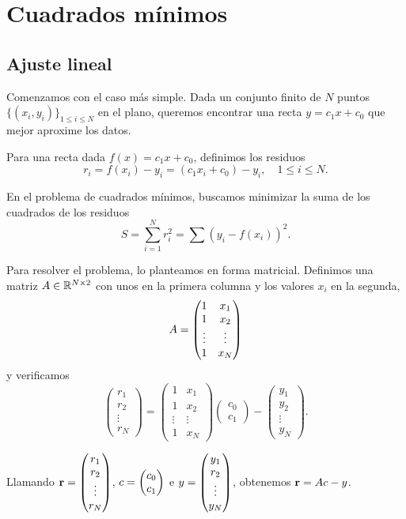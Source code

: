\chapter{Cuadrados mínimos}

\section{Ajuste lineal}
Comenzamos con el caso más simple. Dada un conjunto finito de $N$ puntos $\{(x_i, y_i)\}_{1 \le i \le N}$ en el plano, queremos encontrar una recta $y = c_1 x + c_0$ que mejor aproxime los datos.

Para una recta dada $f(x) = c_1 x + c_0$, definimos los residuos
$$
r_i = f(x_i) - y_i = (c_1 x_i + c_0) - y_i, \quad 1 \le i \le N.
$$

En el problema de cuadrados mínimos, buscamos minimizar la suma de los cuadrados de los residuos
$$
S = \sum_{i = 1}^N r_i^2 = \sum (y_i - f(x_i))^2.
$$

Para resolver el problema, lo planteamos en forma matricial. Definimos una matriz $\Ab \in \R^{N \times 2}$ con unos en la primera columna y los valores $x_i$ en la segunda,
$$
\Ab = \begin{pmatrix}
1 & x_1 \\
1 & x_2 \\
\vdots & \vdots \\
1 & x_N
\end{pmatrix}
$$
y verificamos
$$
\begin{pmatrix}
r_1 \\
r_2 \\
\vdots \\
r_N
\end{pmatrix} =
\begin{pmatrix}
1 & x_1 \\
1 & x_2 \\
\vdots & \vdots \\
1 & x_N
\end{pmatrix}
\begin{pmatrix}
c_0 \\
c_1
\end{pmatrix}
- \begin{pmatrix}
y_1 \\
y_2 \\
\vdots \\
y_N
\end{pmatrix}.
$$

Llamando $\mathbf{r} = \begin{pmatrix}
r_1 \\
r_2 \\
\vdots \\
r_N
\end{pmatrix}$,
$\cb = \begin{pmatrix}
c_0 \\
c_1
\end{pmatrix}$ e  $\yb = \begin{pmatrix}
y_1 \\
r_2 \\
\vdots \\
y_N
\end{pmatrix}$, obtenemos $\rb = \Ab \cb - \yb$.

